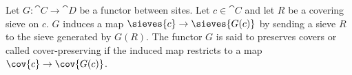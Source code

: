 \begin{definition}
Let $G:\cat{C} \rightarrow \cat{D}$ be a functor between sites.
Let $c\in \cat{C}$ and let $R$ be a covering sieve on $c$.
$G$ induces a map $\sieves{c} \rightarrow \sieves{G(c)}$
by sending a sieve $R$ to the sieve generated by $G(R)$.
The functor $G$ is said to preserves covers or called cover-preserving 
if the induced map restricts to a map $\cov{c} \rightarrow \cov{G(c)}$.
\end{definition}